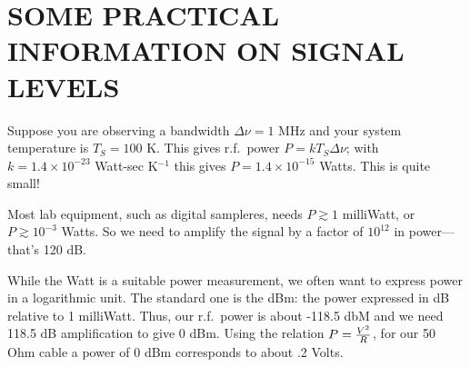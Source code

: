 \documentclass[psfig,preprint]{aastex}
\begin{document}
\enlargethispage{1in}

\section {SOME PRACTICAL INFORMATION ON SIGNAL LEVELS} 

	Suppose you are observing a bandwidth $\Delta \nu = 1$ MHz and
your system temperature is $T_S = 100$ K. This gives r.f.\ power $P =
kT_S\Delta \nu$; with $k = 1.4 \times 10^{-23}$ Watt-sec K$^{-1}$ this
gives $P = 1.4 \times 10^{-15}$ Watts. This is quite small!

	Most lab equipment, such as digital sampleres, needs $P \gtrsim
1$ milliWatt, or $P \gtrsim 10^{-3}$ Watts. So we need to amplify the
signal by a factor of $10^{12}$ in power---that's 120 dB. 

	While the Watt is a suitable power measurement, we often want to
express power in a logarithmic unit. The standard one is the dBm: the
power expressed in dB relative to 1 milliWatt. Thus, our r.f.\ power is
about -118.5 dbM and we need 118.5 dB amplification to give 0 dBm. Using
the relation $P = {V^2 \over R}$, for our 50 Ohm cable a power of 0 dBm
corresponds to about .2 Volts.
\end{document}
